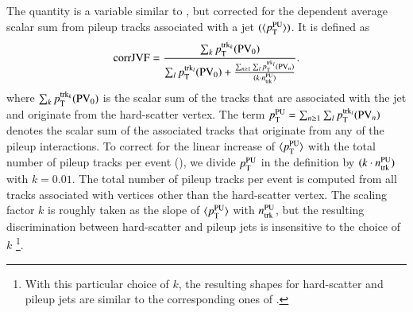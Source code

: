 \documentclass{atlasnote}
\begin{document}
\subsection{\cJVF}
The quantity \cJVF is a variable similar to \JVF, but corrected for the \NPV dependent average scalar sum \pT from pileup tracks associated 
with a jet $(\langle p_{\mathrm{T}}^{\mathrm{PU}}\rangle)$. 
It is defined as 
\begin{equation}
{\rm corrJVF} = \frac{\sum_k{p_{\mathrm{T}}^{{\rm trk}_k}({\rm PV}_0)}}{\sum_l p_{\mathrm{T}}^{{\rm trk}_l}({\rm PV}_0) + \frac{\sum_{n\geq1}\sum_l p_{\mathrm{T}}^{{\rm trk}_l}({\rm PV}_n)}{ (k \cdot n_\mathrm{trk}^\mathrm{PU})}}.
\label{eq:corrJVF}
\end{equation}
where $\sum_k{p_{\mathrm{T}}^{{\rm trk}_k}({\rm PV}_0)}$ is the scalar \pT sum 
of the tracks that are associated with the jet and originate from the hard-scatter vertex.
The term $p_{\mathrm{T}}^{\mathrm{PU}}=\sum_{n\geq1}\sum_l p_{\mathrm{T}}^{{\rm trk}_l}({\rm PV}_n)$ denotes the scalar \pT sum of the associated tracks 
that originate from any of the pileup interactions. To correct for the linear increase of $\langle p_{\mathrm{T}}^{\mathrm{PU}}\rangle$ with  the total number of pileup tracks per 
event (\nPUtrk), we divide $p_{\mathrm{T}}^{\mathrm{PU}}$ in the \cJVF definition by $(k \cdot n_\mathrm{trk}^\mathrm{PU})$ with $k=0.01$.
The total number of pileup tracks per event is computed from all tracks associated with vertices other than the hard-scatter vertex.
The scaling factor $k$ is roughly taken as the slope of $\langle p_{\mathrm{T}}^{\mathrm{PU}}\rangle$ with 
$n_\mathrm{trk}^\mathrm{PU}$, but the resulting discrimination between hard-scatter and pileup jets is insensitive to the choice of $k$%
\footnote{With this particular choice of $k$, the resulting \cJVF shapes for hard-scatter and pileup jets are similar to the corresponding ones
of \JVF.}. 
\end{document}
